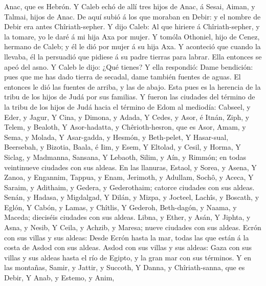 Anac, que es Hebrón.  Y Caleb echó de allí tres hijos de
Anac, á Sesai, Aiman, y Talmai, hijos de Anac.  De aquí
subió á los que moraban en Debir: y el nombre de Debir era antes
Chîriath-sepher.  Y dijo Caleb: Al que hiriere á
Chîriath-sepher, y la tomare, yo le daré á mi hija Axa por mujer.
 Y tomóla Othoniel, hijo de Cenez, hermano de Caleb; y él
le dió por mujer á su hija Axa.  Y aconteció que cuando la
llevaba, él la persuadió que pidiese á su padre tierras para labrar.
Ella entonces se apeó del asno. Y Caleb le dijo: ¿Qué tienes?
 Y ella respondió: Dame bendición: pues que me has dado
tierra de secadal, dame también fuentes de aguas. El entonces le dió las
fuentes de arriba, y las de abajo.  Esta pues es la
herencia de la tribu de los hijos de Judá por sus familias.
 Y fueron las ciudades del término de la tribu de los hijos
de Judá hacia el término de Edom al mediodía: Cabseel, y Eder, y Jagur,
 Y Cina, y Dimona, y Adada,  Y Cedes, y Asor,
é Itnán,  Ziph, y Telem, y Bealoth,  Y
Asor-hadatta, y Chêrioth-hesron, que es Asor,  Amam, y
Sema, y Molada,  Y Asar-gadda, y Hesmón, y Beth-pelet,
 Y Hasar-sual, Beersebah, y Bizotia,  Baala, é
Iim, y Esem,  Y Eltolad, y Cesil, y Horma,  Y
Siclag, y Madmanna, Sansana,  Y Lebaoth, Silim, y Aín, y
Rimmón; en todas veintinueve ciudades con sus aldeas.  En
las llanuras, Estaol, y Sorea, y Asena,  Y Zanoa, y
Engannim, Tappua, y Enam,  Jerimoth, y Adullam, Sochô, y
Aceca,  Y Saraim, y Adithaim, y Gedera, y Gederothaim;
catorce ciudades con sus aldeas.  Senán, y Hadasa, y
Migdalgad,  Y Dilán, y Mizpa, y Jocteel, 
Lachîs, y Boscath, y Eglón,  Y Cabón, y Lamas, y Chîtlis,
 Y Gederoh, Beth-dagón, y Naama, y Maceda; dieciséis
ciudades con sus aldeas.  Libna, y Ether, y Asán,
 Y Jiphta, y Asna, y Nesib,  Y Ceila, y
Achzib, y Maresa; nueve ciudades con sus aldeas.  Ecrón con
sus villas y sus aldeas:  Desde Ecrón hasta la mar, todas
las que están á la costa de Asdod con sus aldeas.  Asdod
con sus villas y sus aldeas: Gaza con sus villas y sus aldeas hasta el
río de Egipto, y la gran mar con sus términos.  Y en las
montañas, Samir, y Jattir, y Succoth,  Y Danna, y
Chîriath-sanna, que es Debir,  Y Anab, y Estemo, y Anim,
